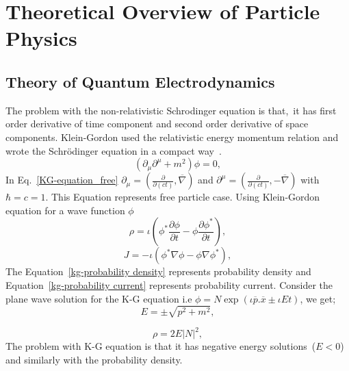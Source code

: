 \section{Theoretical Overview of Particle Physics}
\subsection{Theory of Quantum Electrodynamics}
The problem with the non-relativistic Schrodinger equation is that,~it has first order derivative of time component and second order derivative of space components. Klein-Gordon used the relativistic energy momentum relation and wrote the Schrödinger equation in a compact way~\cite{Griffith87}.
\begin{equation}\label{KG-equation_free}
(\partial_{\mu}\partial^{\mu}+m^{2})\phi=0,
\end{equation}
In Eq.~\ref{KG-equation_free} $\partial_{\mu}=(\frac{\partial}{\partial(ct)},\overline{\nabla})$ and $\partial^{\mu}=(\frac{\partial}{\partial(ct)},-\overline{\nabla})$ with $\hbar=c=1$.
This Equation represents free particle case. Using Klein-Gordon equation for a wave function $\phi$
\begin{equation}\label{kg-probability density}
\rho=\iota(\phi^{*}\frac{\partial\phi}{\partial t}-\phi\frac{\partial\phi^{*}}{\partial t}),
\end{equation}
\begin{equation}\label{kg-probability current}
J=-\iota(\phi^{*}\nabla\phi-\phi\nabla\phi^{*}),
\end{equation}
The Equation~\ref{kg-probability density} represents probability density and Equation~\ref{kg-probability current} represents probability current.
Consider the plane wave solution for the K-G equation i.e $\phi=N\exp(\iota\overline{p}.\overline{x}\pm\iota Et)$, we get;
\begin{equation}
E=\pm\sqrt{p^{2}+m^{2}},
\end{equation}

\begin{equation}
\rho=2E|N|^{2},
\end{equation}
The problem with K-G equation is that it has negative energy solutions~($E<0$) and similarly with the probability density.

